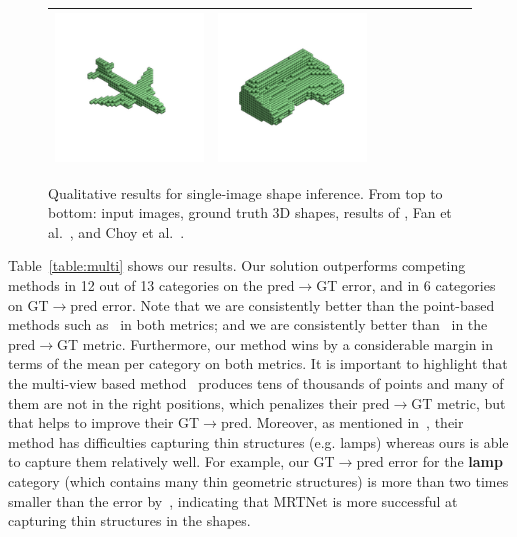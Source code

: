 \begin{figure}[t]
\begin{tabular}{c|cccccccc}
\includegraphics[width=.12\linewidth]{rendering/i2pc_comparison/d18592d9615b01bbbc0909d98a1ff2_r2n2_v1.png} &
\includegraphics[width=.12\linewidth]{rendering/i2pc_comparison/cceaeed0d8cf5bdbca68d7e2f215cb_r2n2_v1.png} \\
\hline
\end{tabular}
\vspace{-8pt}
    \caption{\label{fig:inference-comp} 
    \small Qualitative results for single-image shape inference. From top to bottom: input images, ground truth 3D shapes, results of \mrtnet, Fan et al.~\cite{fan2016point}, and Choy et al.~\cite{choy20163d}.
    }
\vspace{-12pt}
\end{figure}

Table~\ref{table:multi} shows our results. 
Our solution outperforms competing methods in 12 out of 13 categories on the pred$\to$GT error, and in
6 categories on GT$\to$pred error.
Note that we are consistently better than the point-based methods such as~\cite{fan2016point} in both metrics; 
and we are consistently better than~\cite{lin2018learning} in the pred$\to$GT metric.
Furthermore, our method wins by a considerable margin in terms of the mean per category on both metrics. 
It is important to highlight that the multi-view based method~\cite{lin2018learning} produces tens of thousands of points and many of them
are not in the right positions, which penalizes their pred$\to$GT metric, but that helps to improve their GT$\to$pred.
Moreover, as mentioned in~\cite{lin2018learning}, their method has difficulties capturing thin structures (e.g. lamps) whereas ours is able
to capture them relatively well.
For example, our GT$\to$pred error for the \textbf{lamp} category (which contains many thin geometric structures) is more than two times smaller than the error by~\cite{lin2018learning}, indicating that MRTNet is more successful at capturing thin structures in the shapes.

